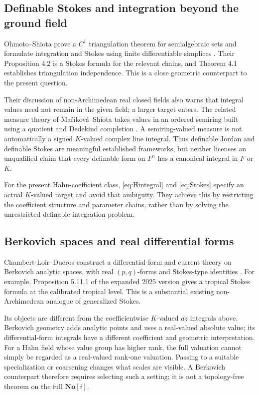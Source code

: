 \documentclass[11pt,letterpaper]{article}
\theoremstyle{definition}
\theoremstyle{remark}
\newcommand{\No}{\mathbf{No}}
\numberwithin{equation}{section}
\begin{document}
\subsection{Definable Stokes and integration beyond the ground field}
Ohmoto--Shiota prove a $C^1$ triangulation theorem for semialgebraic sets and formulate integration and Stokes using finite differentiable simplices \cite{OS}. Their Proposition 4.2 is a Stokes formula for the relevant chains, and Theorem 4.1 establishes triangulation independence. This is a close geometric counterpart to the present question.

Their discussion of non-Archimedean real closed fields also warns that integral values need not remain in the given field; a larger target enters. The related measure theory of Ma\v r\'{\i}kov\'{a}--Shiota takes values in an ordered semiring built using a quotient and Dedekind completion \cite{MS}. A semiring-valued measure is not automatically a signed $K$-valued complex line integral. Thus definable Jordan and definable Stokes are meaningful established frameworks, but neither licenses an unqualified claim that every definable form on $F^n$ has a canonical integral in $F$ or $K$.

For the present Hahn-coefficient class, \eqref{eq:Hintegral} and \eqref{eq:Stokes} specify an actual $K$-valued target and avoid that ambiguity. They achieve this by restricting the coefficient structure and parameter chains, rather than by solving the unrestricted definable integration problem.

\subsection{Berkovich spaces and real differential forms}
Chambert-Loir--Ducros construct a differential-form and current theory on Berkovich analytic spaces, with real $(p,q)$-forms and Stokes-type identities \cite{CLD}. For example, Proposition 5.11.1 of the expanded 2025 version gives a tropical Stokes formula at the calibrated tropical level. This is a substantial existing non-Archimedean analogue of generalized Stokes.

Its objects are different from the coefficientwise $K$-valued $dz$ integrals above. Berkovich geometry adds analytic points and uses a real-valued absolute value; its differential-form integrals have a different coefficient and geometric interpretation. For a Hahn field whose value group has higher rank, the full valuation cannot simply be regarded as a real-valued rank-one valuation. Passing to a suitable specialization or coarsening changes what scales are visible. A Berkovich counterpart therefore requires selecting such a setting; it is not a topology-free theorem on the full $\No[i]$.
\end{document}
